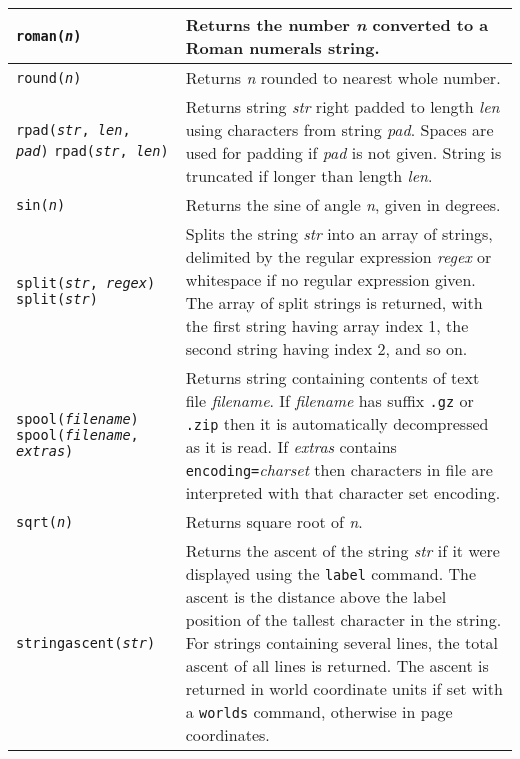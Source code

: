 \begin{longtable}{|p{5cm}|p{7cm}|}
\hline

\texttt{roman(\textit{n})} &
Returns the number \textit{n} converted to a Roman numerals string. \\

\hline

\texttt{round(\textit{n})} &
Returns \textit{n} rounded to nearest whole number. \\

\hline

\texttt{rpad(\textit{str}, \textit{len}, \textit{pad})}
\texttt{rpad(\textit{str}, \textit{len})} &
Returns string \textit{str} right padded to length \textit{len}
using characters from string \textit{pad}.
Spaces are used for padding if \textit{pad} is not given.
String is truncated if longer than length \textit{len}. \\

\hline

\texttt{sin(\textit{n})} &
Returns the sine of angle \textit{n}, given in degrees. \\

\hline

\texttt{split(\textit{str}, \textit{regex})}
\texttt{split(\textit{str})} &
Splits the string \textit{str} into an array of strings, delimited by the
regular expression \textit{regex} or whitespace if no regular expression given.
The array of split strings is returned,
with the first string having array index 1, the
second string having index 2, and so on. \\

\hline

\texttt{spool(\textit{filename})}
\texttt{spool(\textit{filename}, \textit{extras})} &
Returns string containing contents of text file \textit{filename}.
If \textit{filename} has suffix
\texttt{.gz} or \texttt{.zip}
then it is automatically decompressed as it is read.
If \textit{extras} contains \texttt{encoding=}\textit{charset}
then characters in file are interpreted with
that character set encoding. \\

\hline

\texttt{sqrt(\textit{n})} &
Returns square root of \textit{n}. \\

\hline

\texttt{stringascent(\textit{str})} &
Returns the ascent of the string \textit{str}
if it were displayed using the \texttt{label} command.
The ascent is the distance above the label position of
the tallest character in the string.
For strings containing several lines, the total ascent of all
lines is returned.
The ascent is returned in world coordinate units if set with a
\texttt{worlds} command, otherwise in page coordinates. \\


\end{longtable}
